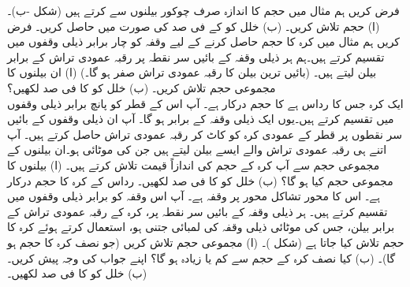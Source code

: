 فرض کریں ہم مثال  میں حجم کا اندازہ صرف  چوکور بیلنوں سے کرتے ہیں (شکل -ب)۔ (ا) حجم  تلاش کریں۔ (ب) خلل  کو  کے فی صد کی صورت میں حاصل کریں۔  
فرض کریں ہم مثال  میں کرہ کا حجم حاصل کرنے کے لیے وقفہ  کو چار برابر ذیلی وقفوں میں تقسیم کرتے ہیں۔ہم ہر ذیلی وقفہ  کے بائیں سر نقطہ پر رقبہ عمودی تراش کے برابر بیلن لیتے ہیں۔ (بائیں ترین بیلن کا رقبہ عمودی تراش صفر ہو گا۔) (ا) ان بیلنوں کا مجموعی حجم  تلاش کریں۔ (ب) خلل  کو  کا فی صد لکھیں؟\\
ایک کرہ جس کا رداس  ہے کا حجم درکار ہے۔ آپ اس کے قطر کو پانچ برابر ذیلی وقفوں میں تقسیم کرتے ہیں۔یوں ایک ذیلی وقفہ  کے برابر ہو گا۔ آپ ان ذیلی وقفوں  کے بائیں سر نقطوں پر قطر کے عمودی  کرہ کو کاٹ کر رقبہ عمودی تراش حاصل کرتے ہیں۔ آپ اتنے ہی رقبہ عمودی تراش والے ایسے بیلن لیتے ہیں جن کی موٹائی  ہو۔ان بیلنوں کے مجموعی حجم سے آپ کرہ کے حجم کی اندازاً قیمت تلاش کرتے ہیں۔ (ا) بیلنوں کا مجموعی حجم  کیا ہو گا؟ (ب)  خلل  کو  کا فی صد لکھیں۔
رداس  کے کرہ کا حجم درکار ہے۔ اس کا محور تشاکل محور   پر  وقفہ  ہے۔ آپ اس وقفہ کو  برابر ذیلی وقفوں میں تقسیم کرتے ہیں۔ ہر ذیلی وقفہ  کے بائیں سر نقطہ پر، کرہ کے رقبہ عمودی تراش کے برابر بیلن، جس کی موٹائی ذیلی وقفہ کی لمبائی جتنی ہو،  استعمال کرتے ہوئے کرہ کا حجم تلاش کیا جاتا ہے (شکل )۔ (ا) مجموعی حجم  تلاش کریں (جو نصف کرہ کا حجم ہو گا)۔ (ب) کیا  نصف کرہ کے حجم  سے کم یا زیادہ ہو گا؟ اپنے جواب کی وجہ پیش کریں۔ (ب) خلل  کو  کا فی صد لکھیں۔\\
